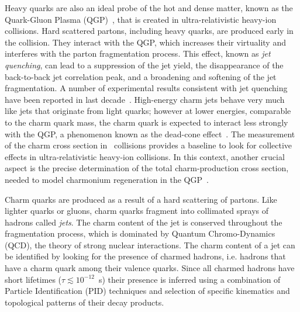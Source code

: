 \documentclass[a4paper]{jpconf}
\begin{document}
Heavy quarks are also an ideal probe of the hot and dense matter, known as the Quark-Gluon Plasma (QGP)~\cite{STAR:2005a, PHENIX:2005a, ALICE:2010b, ALICE:2011b, CMS:2013d, ATLAS:2013c}, 
that is created in ultra-relativistic heavy-ion collisions. 
Hard scattered partons, including heavy quarks, are produced early in the collision. They interact with the QGP, which increases their virtuality and interferes with the
parton fragmentation process.
This effect, known as \emph{jet quenching}, can lead to a suppression of the jet yield, the disappearance of the back-to-back jet correlation peak,
and a broadening and softening of the jet fragmentation. 
A number of experimental results consistent with jet quenching have been reported in last decade~\cite{PHENIX:2003a, PHENIX:2008b, STAR:2003b, STAR:2003c, STAR:2006a, ALICE:2010d, CMS:2011c, CMS:2012b, ATLAS:2014d, ALICE:2015a}.
High-energy charm jets behave very much like jets that originate from light quarks; however at lower energies, comparable to the charm quark mass, the charm quark is expected
to interact less strongly with the QGP, a phenomenon known as the dead-cone effect~\cite{Dokshitzer:2001}.
The measurement of the charm cross section in \pp\ collisions provides a baseline to look for collective effects in ultra-relativistic
heavy-ion collisions. In this context, another crucial aspect is the precise determination of the
total charm-production cross section, needed to model charmonium regeneration in the QGP~\cite{Zhao:2011}.

Charm quarks are produced as a result of a hard scattering of partons. Like lighter quarks or gluons, charm quarks
fragment into collimated sprays of hadrons called \emph{jets}. The charm content of the jet is conserved throughout the fragmentation process,
which is dominated by Quantum Chromo-Dynamics (QCD), the theory of strong nuclear interactions.
The charm content of a jet can be identified by looking for the presence of charmed hadrons, i.e. hadrons that have
a charm quark among their valence quarks. Since all charmed hadrons have short lifetimes ($\tau \lesssim 10^{-12}$~s) their presence is inferred
using a combination of Particle Identification (PID) techniques and selection of specific kinematics and topological patterns of their decay products.
\end{document}
